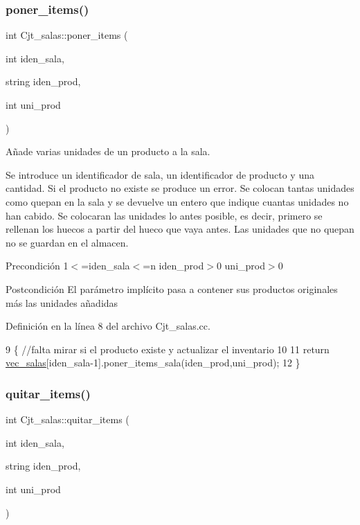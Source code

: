 \subsubsection{\texorpdfstring{poner\+\_\+items()}{poner\_items()}}
{\footnotesize\ttfamily int Cjt\+\_\+salas\+::poner\+\_\+items (\begin{DoxyParamCaption}\item[{int}]{iden\+\_\+sala,  }\item[{string}]{iden\+\_\+prod,  }\item[{int}]{uni\+\_\+prod }\end{DoxyParamCaption})}



Añade varias unidades de un producto a la sala. 

Se introduce un identificador de sala, un identificador de producto y una cantidad. Si el producto no existe se produce un error. Se colocan tantas unidades como quepan en la sala y se devuelve un entero que indique cuantas unidades no han cabido. Se colocaran las unidades lo antes posible, es decir, primero se rellenan los huecos a partir del hueco que vaya antes. Las unidades que no quepan no se guardan en el almacen. \begin{DoxyPrecond}{Precondición}
1$<$=iden\+\_\+sala$<$=n iden\+\_\+prod$>$0 uni\+\_\+prod$>$0 
\end{DoxyPrecond}
\begin{DoxyPostcond}{Postcondición}
El parámetro implícito pasa a contener sus productos originales más las unidades añadidas 
\end{DoxyPostcond}


Definición en la línea 8 del archivo Cjt\+\_\+salas.\+cc.


\begin{DoxyCode}
9 \{ \textcolor{comment}{//falta mirar si el producto existe y actualizar el inventario }
10   
11   \textcolor{keywordflow}{return} \hyperlink{class_cjt__salas_a3f130cc8bab35f449de8be69283af09e}{vec\_salas}[iden\_sala-1].poner\_items\_sala(iden\_prod,uni\_prod);
12 \}
\end{DoxyCode}
\mbox{\label{class_cjt__salas_acd5d8368e51d7bbd557958063c81cc43}} 
\subsubsection{\texorpdfstring{quitar\+\_\+items()}{quitar\_items()}}
{\footnotesize\ttfamily int Cjt\+\_\+salas\+::quitar\+\_\+items (\begin{DoxyParamCaption}\item[{int}]{iden\+\_\+sala,  }\item[{string}]{iden\+\_\+prod,  }\item[{int}]{uni\+\_\+prod }\end{DoxyParamCaption})}



